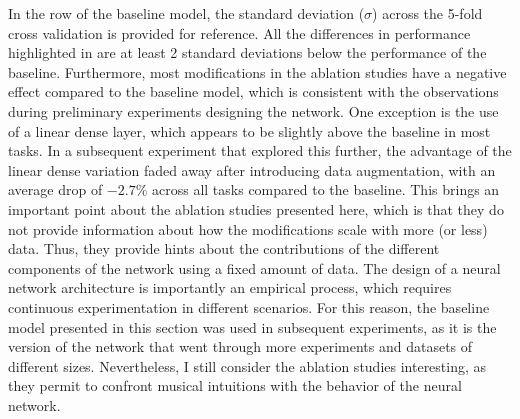 In the row of the baseline model, the standard deviation
($\sigma$) across the 5-fold cross validation is provided
for reference. All the differences in performance
highlighted in  are at least 2 standard
deviations below the performance of the baseline.
Furthermore, most modifications in the ablation studies have
a negative effect compared to the baseline model, which is
consistent with the observations during preliminary
experiments designing the network. One exception is the use
of a linear dense layer, which appears to be slightly above
the baseline in most tasks. In a subsequent experiment that
explored this further, the advantage of the linear dense
variation faded away after introducing data augmentation,
with an average drop of $-2.7\%$ across all tasks compared
to the baseline. This brings an important point about the
ablation studies presented here, which is that they do not
provide information about how the modifications scale with
more (or less) data. Thus, they provide hints about the
contributions of the different components of the network
using a fixed amount of data. The design of a neural network
architecture is importantly an empirical process, which
requires continuous experimentation in different scenarios.
For this reason, the baseline model presented in this
section was used in subsequent experiments, as it is the
version of the network that went through more experiments
and datasets of different sizes. Nevertheless, I still
consider the ablation studies interesting, as they permit to
confront musical intuitions with the behavior of the neural
network. 
